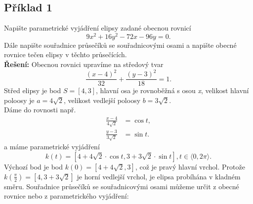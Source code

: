 		\subsection*{Příklad 1}
		\noindent Napište parametrické vyjádření elipsy zadané obecnou rovnicí
		$$9x^2+16y^2-72x-96y=0.$$
		Dále napište souřadnice průsečíků se souřadnicovými osami a napište obecné rovnice tečen elipsy v těchto  průsečících. \\[10pt]
		\textbf{Řešení:} Obecnou rovnici upravíme na středový tvar
		$$\frac{(x-4)^2}{32}+\frac{(y-3)^2}{18}=1.$$
		Střed elipsy je bod $S=[4,3]$, hlavní osa je rovnoběžná s osou \textit{x}, velikost hlavní poloosy je $a=4\sqrt{2}$,
		velikost vedlejší poloosy $b=3\sqrt{2}$. \\
		Dáme do rovnosti např.
		\begin{align*}
			\frac{x-4}{4\sqrt{2}} & = \cos{t},  \\
			\frac{y-3}{3\sqrt{2}} & = \sin{t} . 
		\end{align*}
		a máme parametrické vyjádření
		$$k(t) = [4+4\sqrt{2} \cdot \cos{t}, 3+3\sqrt{2} \cdot \sin{t}], t\in\langle0,2\pi\rangle.$$
		Výchozí bod je bod $k(0) = [4+4\sqrt{2},3]$, což je pravý hlavní vrchol. Protože $k\left(\frac{\pi}{2}\right) = [4, 3+3\sqrt{2}]$
		je horní vedlejší vrchol, je elipsa probíhána v kladném směru. Souřadnice průsečíků se souřadnicovými osami
		můžeme určit z obecné rovnice nebo z parametrického vyjádření:
